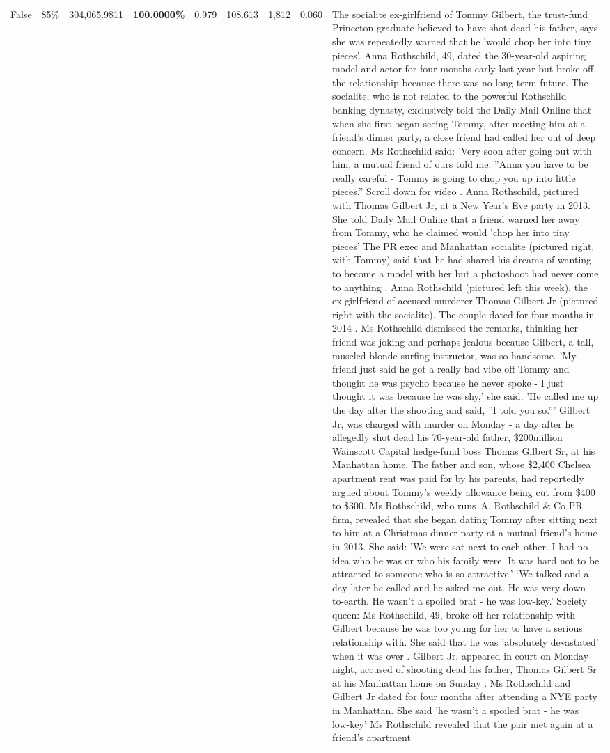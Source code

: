 \begin{table}[H]
\begin{tabular}{lllrlllll}
False & 85\% & \color{red} 304,065.9811 & \bfseries \color{red} 100.0000\% & 0.979 & 108.613 & 1,812 & 0.060 & The socialite ex-girlfriend of Tommy Gilbert, the trust-fund Princeton graduate believed to have shot dead his father, says she was repeatedly warned that he 'would chop her into tiny pieces'. Anna Rothschild, 49, dated the 30-year-old aspiring model and actor for four months early last year but broke off the relationship because there was no long-term future. The socialite, who is not related to the powerful Rothschild banking dynasty, exclusively told the Daily Mail Online that when she first began seeing Tommy, after meeting him at a friend's dinner party, a close friend had called her out of deep concern. Ms Rothschild said: 'Very soon after going out with him, a mutual friend of ours told me: ''Anna you have to be really careful - Tommy is going to chop you up into little pieces.'' Scroll down for video . Anna Rothschild, pictured with Thomas Gilbert Jr, at a New Year's Eve party in 2013. She told Daily Mail Online that a friend warned her away from Tommy, who he claimed would 'chop her into tiny pieces' The PR exec and Manhattan socialite (pictured right, with Tommy) said that he had shared his dreams of wanting to become a model with her but a photoshoot had never come to anything . Anna Rothschild (pictured left this week), the ex-girlfriend of accused murderer Thomas Gilbert Jr (pictured right with the socialite). The couple dated for four months in 2014 . Ms Rothschild dismissed the remarks, thinking her friend was joking and perhaps jealous because Gilbert, a tall, muscled blonde surfing instructor, was so handsome. 'My friend just said he got a really bad vibe off Tommy and thought he was psycho because he never spoke - I just thought it was because he was shy,' she said. 'He called me up the day after the shooting and said, ''I told you so.''' Gilbert Jr, was charged with murder on Monday - a day after he allegedly shot dead his 70-year-old father, \$200million Wainscott Capital hedge-fund boss Thomas Gilbert Sr, at his Manhattan home. The father and son, whose \$2,400 Chelsea apartment rent was paid for by his parents, had reportedly argued about Tommy's weekly allowance being cut from \$400 to \$300. Ms Rothschild, who runs A. Rothschild \& Co PR firm, revealed that she began dating Tommy after sitting next to him at a Christmas dinner party at a mutual friend's home in 2013. She said: 'We were sat next to each other. I had no idea who he was or who his family were. It was hard not to be attracted to someone who is so attractive.' ‘We talked and a day later he called and he asked me out. He was very down-to-earth. He wasn’t a spoiled brat - he was low-key.’ Society queen: Ms Rothschild, 49, broke off her relationship with Gilbert because he was too young for her to have a serious relationship with. She said that he was 'absolutely devastated' when it was over . Gilbert Jr, appeared in court on Monday night, accused of shooting dead his father, Thomas Gilbert Sr at his Manhattan home on Sunday . Ms Rothschild and Gilbert Jr dated for four months after attending a NYE party in Manhattan. She said 'he wasn't a spoiled brat - he was low-key' Ms Rothschild revealed that the pair met again at a friend’s apartment 
\end{tabular}
\end{table}
